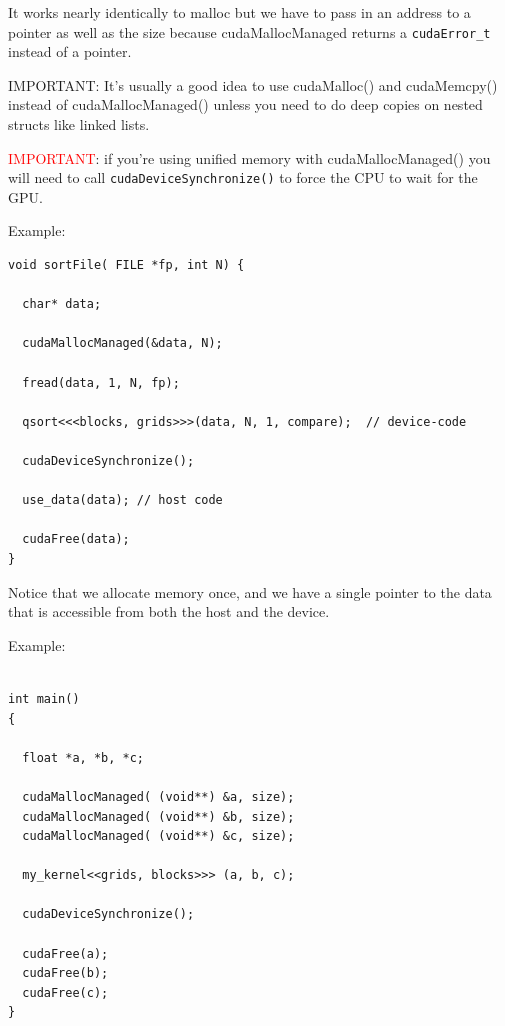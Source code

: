 It works nearly identically to malloc but we have to pass in an address to a
pointer as well as the size because cudaMallocManaged returns a \verb!cudaError_t!
instead of a pointer.

IMPORTANT: It’s usually a good idea to use cudaMalloc() and cudaMemcpy() instead
of cudaMallocManaged() unless you need to do deep copies on nested structs like
linked lists.

\textcolor{red}{IMPORTANT}: if you’re using unified memory with
cudaMallocManaged() you will need to call \verb!cudaDeviceSynchronize()! to
force the CPU to wait for the GPU.


Example: 
\begin{lstlisting}
void sortFile( FILE *fp, int N) {

  char* data;
  
  cudaMallocManaged(&data, N);
  
  fread(data, 1, N, fp);
  
  qsort<<<blocks, grids>>>(data, N, 1, compare);  // device-code
  
  cudaDeviceSynchronize();
  
  use_data(data); // host code
  
  cudaFree(data);
}
\end{lstlisting} 
Notice that we allocate memory once, and we have a single pointer to the data that is accessible from both the host and the device.


Example:
\begin{lstlisting}

int main()
{

  float *a, *b, *c;
  
  cudaMallocManaged( (void**) &a, size);
  cudaMallocManaged( (void**) &b, size);
  cudaMallocManaged( (void**) &c, size);
  
  my_kernel<<grids, blocks>>> (a, b, c);
  
  cudaDeviceSynchronize();
  
  cudaFree(a);
  cudaFree(b);
  cudaFree(c);
}
\end{lstlisting}


